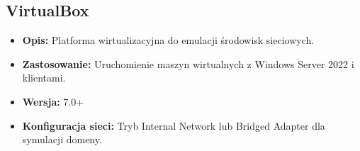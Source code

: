\subsection{VirtualBox}
\begin{itemize}
\item \textbf{Opis:} Platforma wirtualizacyjna do emulacji środowisk sieciowych.
\item \textbf{Zastosowanie:} Uruchomienie maszyn wirtualnych z Windows Server 2022 i klientami.
\item \textbf{Wersja:} 7.0+
\item \textbf{Konfiguracja sieci:} Tryb Internal Network lub Bridged Adapter dla symulacji domeny.
\end{itemize}